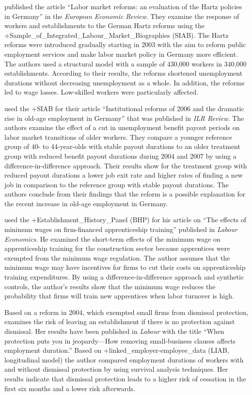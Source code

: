 \documentclass[
]{WileySix}
\begin{document}
\citet{bradley2019} published the article ``Labor market reforms: an evaluation of the Hartz policies in Germany'' in the \emph{European Economic Review}. They examine the response of workers and establishments to the German Hartz reforms using the +Sample\_of\_Integrated\_Labour\_Market\_Biographies\textbar{} (SIAB). The Hartz reforms were introduced gradually starting in 2003 with the aim to reform public employment services and make labor market policy in Germany more efficient. The authors used a structural model with a sample of 430,000 workers in 340,000 establishments. According to their results, the reforms shortened unemployment durations without decreasing unemployment as a whole. In addition, the reforms led to wage losses. Low-skilled workers were particularly affected.

\citet{riphahn2019} used the +SIAB\textbar{} for their article ``Institutional reforms of 2006 and the dramatic rise in old-age employment in Germany'' that was published in \emph{ILR Review}. The authors examine the effect of a cut in unemployment benefit payout periods on labor market transitions of older workers. They compare a younger reference group of 40- to 44-year-olds with stable payout durations to an older treatment group with reduced benefit payout durations during 2004 and 2007 by using a difference-in-difference approach. Their results show for the treatment group with reduced payout durations a lower job exit rate and higher rates of finding a new job in comparison to the reference group with stable payout durations. The authors conclude from their findings that the reform is a possible explanation for the recent increase in old-age employment in Germany.

\citet{schumann2017} used the +Establishment\_History\_Panel\textbar{} (BHP) for his article on ``The effects of minimum wages on firm-financed apprenticeship training'' published in \emph{Labour Economics}. He examined the short-term effects of the minimum wage on apprenticeship training for the construction sector because apprentices were exempted from the minimum wage regulation. The author assumes that the minimum wage may have incentives for firms to cut their costs on apprenticeship training expenditures. By using a difference-in-difference approach and synthetic controls, the author's results show that the minimum wage reduces the probability that firms will train new apprentices when labor turnover is high.

Based on a reform in 2004, which exempted small firms from dismissal protection, \citep{lucke2018} examines the risk of leaving an establishment if there is no protection against dismissal. Her results have been published in \emph{Labour} with the title ``When protection puts you in jeopardy---How removing small-business clauses affects employment duration.'' Based on +linked\_employer-employee\_data\textbar{} (LIAB, longitudinal model) the author compared employment durations of workers with and without dismissal protection by using survival analysis techniques. Her results indicate that dismissal protection leads to a higher risk of cessation in the first six months and a lower risk afterwards.
\end{document}
